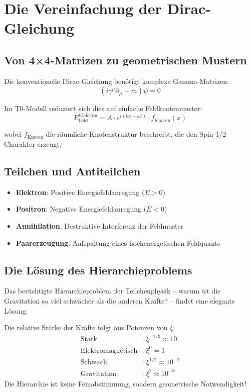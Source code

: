 \documentclass[12pt,a4paper]{article}
\newcommand{\xipar}{\ensuremath{\xi}}
\newcommand{\Efield}{E_\text{field}}
\begin{document}
	\section{Die Vereinfachung der Dirac-Gleichung}
	
	\subsection{Von 4×4-Matrizen zu geometrischen Mustern}
	
	Die konventionelle Dirac-Gleichung benötigt komplexe Gamma-Matrizen:
	\begin{equation}
		(i\gamma^\mu \partial_\mu - m)\psi = 0
	\end{equation}
	
	Im T0-Modell reduziert sich dies auf einfache Feldknotenmuster:
	\begin{equation}
		\Efield^{\text{Elektron}} = A \cdot e^{i(kx - \omega t)} \cdot f_{\text{Knoten}}(x)
	\end{equation}
	
	wobei $f_{\text{Knoten}}$ die räumliche Knotenstruktur beschreibt, die den Spin-1/2-Charakter erzeugt.
	
	\subsection{Teilchen und Antiteilchen}
	
	\begin{itemize}
		\item \textbf{Elektron}: Positive Energiefeldanregung ($E > 0$)
		\item \textbf{Positron}: Negative Energiefeldanregung ($E < 0$)
		\item \textbf{Annihilation}: Destruktive Interferenz der Feldmuster
		\item \textbf{Paarerzeugung}: Aufspaltung eines hochenergetischen Feldquants
	\end{itemize}
	
	\subsection{Die Lösung des Hierarchieproblems}
	
	Das berüchtigte Hierarchieproblem der Teilchenphysik – warum ist die Gravitation so viel schwächer als die anderen Kräfte? – findet eine elegante Lösung:
	
	\begin{important}
		Die relative Stärke der Kräfte folgt aus Potenzen von $\xipar$:
		\begin{align}
			\text{Stark} &: \xipar^{-1/3} \approx 10 \\
			\text{Elektromagnetisch} &: \xipar^0 = 1 \\
			\text{Schwach} &: \xipar^{1/2} \approx 10^{-2} \\
			\text{Gravitation} &: \xipar^2 \approx 10^{-8}
		\end{align}
		Die Hierarchie ist keine Feinabstimmung, sondern geometrische Notwendigkeit!
	\end{important}
	
\end{document}
